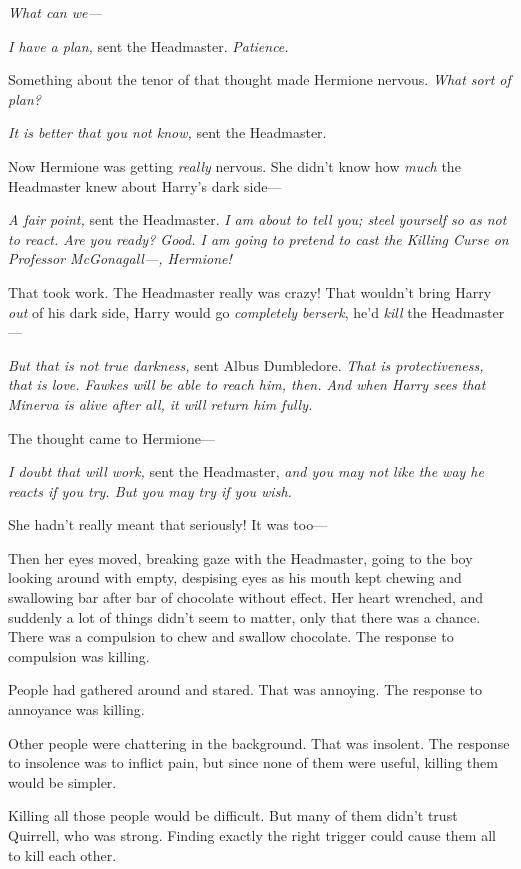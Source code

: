 \emph{What can we---}

\emph{I have a plan,} sent the Headmaster. \emph{Patience.}

Something about the tenor of that thought made Hermione nervous. \emph{What
sort of plan?}

\emph{It is better that you not know,} sent the Headmaster.

Now Hermione was getting \emph{really} nervous. She didn't know how \emph{much}
the Headmaster knew about Harry's dark side\mbox{---}

\emph{A fair point,} sent the Headmaster. \emph{I am about to tell you; steel
yourself so as not to react. Are you ready? Good. I am going to pretend to cast
the Killing Curse on Professor McGonagall---, Hermione!}

That took work. The Headmaster really was crazy! That wouldn't bring Harry
\emph{out} of his dark side, Harry would go \emph{completely berserk}, he'd
\emph{kill} the Headmaster\mbox{---}

\emph{But that is not true darkness,} sent Albus Dumbledore. \emph{That is
protectiveness, that is love. Fawkes will be able to reach him, then. And when
Harry sees that Minerva is alive after all, it will return him fully.}

The thought came to Hermione\mbox{---}

\emph{I doubt that will work,} sent the Headmaster, \emph{and you may not like
the way he reacts if you try. But you may try if you wish.}

She hadn't really meant that seriously! It was too\mbox{---}

Then her eyes moved, breaking gaze with the Headmaster, going to the boy
looking around with empty, despising eyes as his mouth kept chewing and
swallowing bar after bar of chocolate without effect. Her heart wrenched, and
suddenly a lot of things didn't seem to matter, only that there was a chance.
\sbreak
There was a compulsion to chew and swallow chocolate. The response to
compulsion was killing.

People had gathered around and stared. That was annoying. The response to
annoyance was killing.

Other people were chattering in the background. That was insolent. The response
to insolence was to inflict pain, but since none of them were useful, killing
them would be simpler.

Killing all those people would be difficult. But many of them didn't trust
Quirrell, who was strong. Finding exactly the right trigger could cause them
all to kill each other.

